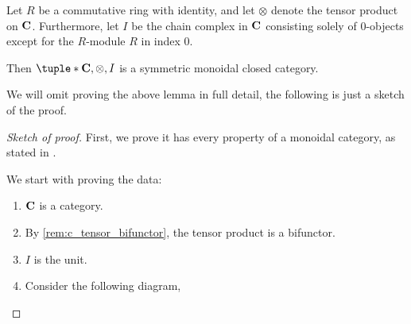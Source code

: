 \begin{lemma}
    \label{lem:c_sym_mon_closed}
    Let \( R \) be a commutative ring with identity, and let \( \otimes \) denote the tensor product on \( \operatorname{\mathbf{C}} \). Furthermore, let \( I \) be the chain complex in \( \operatorname{\mathbf{C}} \) consisting solely of \( 0 \)-objects except for the \( R \)-module \( R \) in index \( 0 \).

    Then \( \tuple*{\C, \otimes, I} \) is a symmetric monoidal closed category.
\end{lemma}

We will omit proving the above lemma in full detail, the following is just a sketch of the proof.
\begin{proof}[Sketch of proof]
    First, we prove it has every property of a monoidal category, as stated in \cite[Definition 6.1.1]{Borceux_1994}.

    We start with proving the data:
    \begin{enumerate}
        \item {
            \( \operatorname{\mathbf{C}} \) is a category.
        }
        \item {
            By \autoref{rem:c_tensor_bifunctor}, the tensor product is a bifunctor.
        }
        \item {
            \( I \) is the unit.
        }
        \item {
            Consider the following diagram,
            \begin{center}
\end{center}}
\end{enumerate}
\end{proof}
